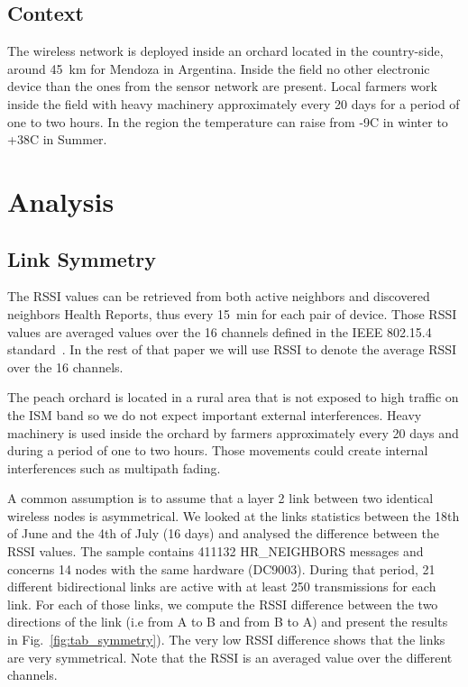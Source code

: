 \documentclass{sig-alternate}
\begin{document}
\subsection{Context}

The wireless network is deployed inside an orchard located in the country-side, around 45~km for Mendoza in Argentina.
Inside the field no other electronic device than the ones from the sensor network are present.
Local farmers work inside the field with heavy machinery approximately every 20 days for a period of one to two hours.
In the region the temperature can raise from -9C in winter to +38C in Summer.

\section{Analysis}
\label{sec:analysis}

\subsection{Link Symmetry}
\label{sec:symmetry}


The RSSI values can be retrieved from both active neighbors and discovered neighbors Health Reports, thus every 15~min for each pair of device.
Those RSSI values are averaged values over the 16 channels defined in the IEEE 802.15.4 standard~\cite{std_ieee802154_2011}.
In the rest of that paper we will use RSSI to denote the average RSSI over the 16 channels.


The peach orchard is located in a rural area that is not exposed to high traffic on the ISM band so we do not expect important external interferences.
Heavy machinery is used inside the orchard by farmers approximately every 20 days and during a period of one to two hours.
Those movements could create internal interferences such as multipath fading.


A common assumption is to assume that a layer 2 link between two identical wireless nodes is asymmetrical.
We looked at the links statistics between the 18th of June and the 4th of July (16 days) and analysed the difference between the RSSI values.
The sample contains 411132 HR\_NEIGHBORS messages and concerns 14 nodes with the same hardware (DC9003).
During that period, 21 different bidirectional links are active with at least 250 transmissions for each link.
For each of those links, we compute the RSSI difference between the two directions of the link (i.e from A to B and from B to A) and present the results in Fig.~\ref{fig:tab_symmetry}).
The very low RSSI difference shows that the links are very symmetrical.
Note that the RSSI is an averaged value over the different channels.
\end{document}
